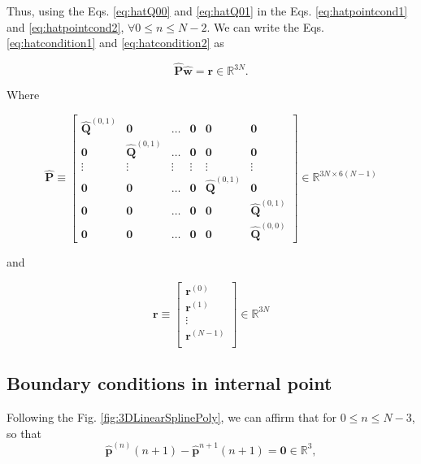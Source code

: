 Thus,
using the Eqs. \ref{eq:hatQ00} and \ref{eq:hatQ01} in 
the Eqs. \ref{eq:hatpointcond1} and \ref{eq:hatpointcond2}, $\forall 0 \leq n\leq N-2$.
We can write the Eqs. \ref{eq:hatcondition1} and \ref{eq:hatcondition2} as 

\begin{equation}
\mathbf{\hat{P}}
\mathbf{\hat{w}}
=\mathbf{r}\in \mathbb{R}^{3N}.
\end{equation}

Where

\begin{equation}
\mathbf{\hat{P}}
\equiv
\begin{bmatrix}
\mathbf{\hat{Q}}^{(0,1)} & \mathbf{0}         & \hdots & \mathbf{0} & \mathbf{0}         & \mathbf{0}\\
\mathbf{0}         & \mathbf{\hat{Q}}^{(0,1)} & \hdots & \mathbf{0} & \mathbf{0}         & \mathbf{0}\\
\vdots             & \vdots             & \vdots & \vdots     & \vdots             & \vdots    \\ 
\mathbf{0}         & \mathbf{0}         & \hdots & \mathbf{0} & \mathbf{\hat{Q}}^{(0,1)} & \mathbf{0}\\
\mathbf{0}         & \mathbf{0}         & \hdots & \mathbf{0} & \mathbf{0}         & \mathbf{\hat{Q}}^{(0,1)}\\
\mathbf{0}         & \mathbf{0}         & \hdots & \mathbf{0} & \mathbf{0}         & \mathbf{\hat{Q}}^{(0,0)}
\end{bmatrix}
\in \mathbb{R}^{3N\times 6(N-1)}
\end{equation}

and 

\begin{equation}
\mathbf{r}
\equiv
\begin{bmatrix}
\mathbf{r}^{(0)}\\
\mathbf{r}^{(1)}\\
\vdots\\
\mathbf{r}^{(N-1)}\\
\end{bmatrix}
\in \mathbb{R}^{3N}
\end{equation}



\subsection{Boundary conditions in internal point}
Following the Fig. \ref{fig:3DLinearSplinePoly}, 
we can affirm that for $0 \leq n\leq N-3$,
so that
\begin{equation}\label{eq:hatbound1}
\mathbf{\hat{p}}^{(n)}(n+1)-\mathbf{\hat{p}}^{n+1}(n+1)
=
\mathbf{0}\in \mathbb{R}^{3},
\end{equation}


